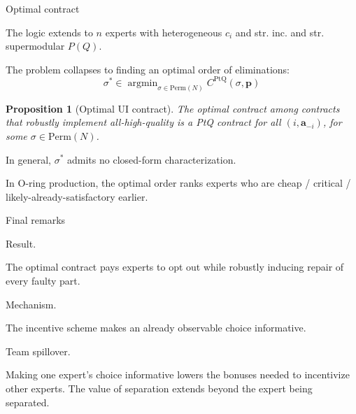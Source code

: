 \documentclass[10pt,aspectratio=169, compressed]{beamer}
\DeclareMathOperator*{\argmin}{argmin}
\newtheorem{proposition}{Proposition}
\begin{document}
\begin{frame}[label=optcontract]{Optimal contract}

The logic extends to $n$ experts with heterogeneous $c_i$ and str. inc. and str. supermodular $P(Q)$.

\medskip

The problem collapses to finding an {optimal order} of eliminations:
$$\displaystyle\sigma^* \in \argmin_{\sigma\in\mathrm{Perm}(N)} C^{\mathrm{PtQ}}(\sigma,\mathbf p)$$

\bigskip

\begin{proposition}[Optimal UI contract]
The optimal contract among contracts that robustly implement all-high-quality is a PtQ contract for all $(i, \mathbf a_{-i})$, for some $\sigma \in \mathrm{Perm}(N)$.
\end{proposition}

\medskip

In general, $\sigma^*$ admits no closed-form characterization.
\hfill\hyperlink{proofsketch}{}
\smallskip

In O-ring production, the optimal order ranks experts who are cheap / critical / likely-already-satisfactory earlier.
\end{frame}








\begin{frame}{Final remarks}


Result.
\smallskip

The optimal contract pays experts to opt out while robustly inducing repair of every faulty part.

    \bigskip

Mechanism.
\smallskip

The incentive scheme makes an already observable choice informative.

    \bigskip


Team spillover.
\smallskip

Making one expert's choice informative lowers the bonuses needed to incentivize other experts. The value of separation extends beyond the expert being separated.


\end{frame}
\end{document}
